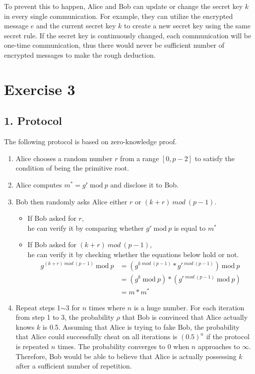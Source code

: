 \documentclass[runningheads]{llncs}
\begin{document}
To prevent this to happen, Alice and Bob can update or change the secret key $k$ in every single communication.
For example, they can utilize the encrypted message $e$ and the current secret key $k$ to create a new secret key using the same secret rule.
If the secret key is continuously changed, each communication will be one-time communication, thus there would never be sufficient number of encrypted messages to make the rough deduction.

\clearpage
\pagebreak

\section*{Exercise 3}
\subsection*{1. Protocol}
The following protocol is based on zero-knowledge proof.

\begin{enumerate}
    \item Alice chooses a random number $r$ from a range $[0, p-2]$ to satisfy the condition of being the primitive root.
    
    \item Alice computes $m^* = g^r\ \text{mod}\ p$ and disclose it to Bob.
    
    \item Bob then randomly asks Alice either $r$ or $(k + r)\ mod \ (p-1)$.
    \begin{itemize}
        \item If Bob asked for $r$, \\
        \text{\quad} he can verify it by comparing whether $g^r\ \text{mod}\ p$ is equal to $m^*$
        \item If Bob asked for $(k + r)\ mod \ (p-1)$, \\ 
        \text{\quad} he can verify it by checking whether the equations below hold or not.
        \begin{align*}
            g^{(k+r)\ mod \ (p-1)}\ \text{mod}\ p & = (g^{k\ mod \ (p-1)} * g^{r\ mod \ (p-1)})\ \text{mod}\ p \\
            & = (g^k\ \text{mod}\ p) * (g^{r\ mod \ (p-1)}\ \text{mod}\ p) \\
            & = m * m^*
        \end{align*}
    \end{itemize}
    
    \item Repeat steps 1$\sim$3 for $n$ times where $n$ is a huge number. 
    For each iteration from step 1 to 3, the probability $\rho$ that Bob is convinced that Alice actually knows $k$ is 0.5. 
    Assuming that Alice is trying to fake Bob, the probability that Alice could successfully cheat on all iterations is $(0.5)^n$ if the protocol is repeated $n$ times. 
    The probability converges to $0$ when $n$ approaches to $\infty$. 
    Therefore, Bob would be able to believe that Alice is actually possessing $k$ after a sufficient number of repetition.
\end{enumerate}
\end{document}
